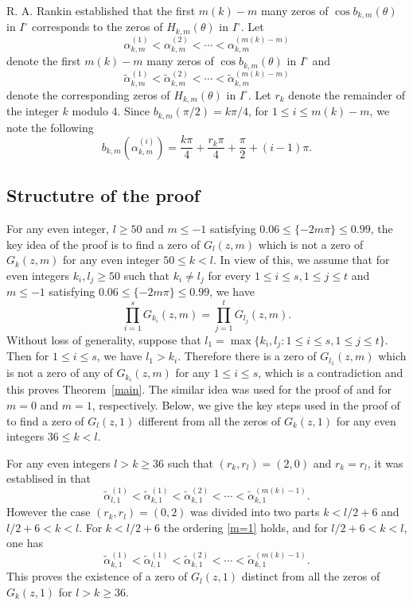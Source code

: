 \documentclass[12pt,reqno]{amsart}
\newcommand{\thmref}[1]{Theorem~\ref{#1}}
\begin{document}
R. A. Rankin \cite{RR} established that the first $m(k)-m$ many zeros of $\cos b_{k,m}(\theta)$ in $I^{\circ}$ corresponds to the zeros of 
$H_{k,m}(\theta)$ in $I^{\circ}$. Let 
$$
\alpha_{k,m}^{(1)}<\alpha_{k,m}^{(2)}<\cdots<\alpha_{k,m}^{(m(k)-m)}
$$  
denote the first $m(k)-m$ many zeros of $\cos b_{k,m}(\theta)$ in $I^{\circ}$ and 
\begin{equation}\label{order}
\tilde{\alpha}_{k,m}^{(1)}<\tilde{\alpha}_{k,m}^{(2)}<\cdots<\tilde{\alpha}_{k,m}^{(m(k)-m)}
\end{equation} 
denote the corresponding zeros of  $H_{k,m}(\theta)$ in $I^{\circ}$. Let $r_k$ denote the remainder of the integer $k$ modulo $4$. Since $b_{k,m}(\pi/2)=k\pi/4$, for $1\le i\le m(k)-m$, we note the following
\begin{equation}\label{bkma}
b_{k,m}(\alpha_{k,m}^{(i)})=\frac{k\pi}{4}+\frac{r_k\pi}{4}+\frac{\pi}{2}+(i-1)\pi.
\end{equation}

\subsection{Structutre of the proof} For any even integer, $l\ge50$ and $m\le -1$ satisfying 
$0.06\le\{-2m\pi\}\le0.99$, the key idea of the proof is to find a zero of $G_l(z,m)$ which is not a zero of $G_k(z,m)$ for any even integer
$50\le k<l$. In view of this, we assume that for even integers $k_i,l_j\ge 50$ such that $k_i\neq l_j$ for every $1\le i\le s, 1\le j\le t$ and $m\le -1$ satisfying 
$0.06\le\{-2m\pi\}\le0.99$, we have 
$$
\prod_{i=1}^sG_{k_i}(z,m)=\prod_{j=1}^tG_{l_j}(z,m).
$$
Without loss of generality, suppose that  $l_1=\max\{k_i,l_j:1\le i\le s,1\le j\le t\}$. Then for $1\le i\le s$, we have $l_1>k_i$. Therefore
there is a zero of $G_{l_1}(z,m)$ which is not a zero of any of $G_{k_i}(z,m)$ for any $1\le i\le s$, which is a contradiction and this proves
\thmref{main}. The similar idea was used for the proof of  \cite[Theorem 1.1]{GKP} and \cite[Theorem 1]{KS2} for $m=0$ and $m=1$, respectively. 
Below, we give the 
key steps used in the proof of \cite[Theorem 1]{KS2} to find a zero of $G_l(z,1)$ different from all the 
zeros of $G_k(z,1)$ for any even integers $36\le k<l$.

For any even integers $l>k\ge36$ such that $(r_k,r_l)=(2,0)$ and $r_k=r_l$, it was establised in \cite{KS2} that 
\begin{equation}\label{m=1}
\tilde{\alpha}_{l,1}^{(1)}<\tilde{\alpha}_{k,1}^{(1)}<\tilde{\alpha}_{k,1}^{(2)}<\cdots<\tilde{\alpha}_{k, 1}^{(m(k)-1)}.
\end{equation}
However the case $(r_k,r_l)=(0,2)$ was divided into two parts $k< l/2+6$ and $ l/2+6<k<l$. For $k< l/2+6$ the ordering \eqref{m=1} holds, and for $l/2+6<k<l$, one has
$$
\tilde{\alpha}_{k,1}^{(1)}<\tilde{\alpha}_{l,1}^{(1)}<\tilde{\alpha}_{k,1}^{(2)}<\cdots<\tilde{\alpha}_{k, 1}^{(m(k)-1)}.
$$
This proves the existence of a zero of $G_l(z,1)$ distinct from all the zeros of $G_k(z,1)$ for $l>k\ge 36$.
\end{document}
